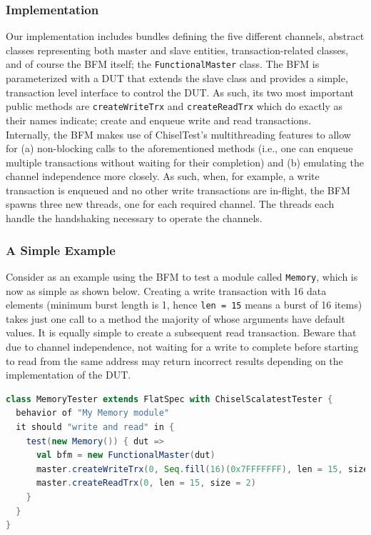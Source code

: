 \documentclass[conference]{IEEEtran}
\begin{document}
\subsubsection{Implementation}
Our implementation includes bundles defining the five different channels, abstract classes representing both master and slave entities, transaction-related classes, and of course the BFM itself; the \texttt{FunctionalMaster} class. The BFM is parameterized with a DUT that extends the slave class and provides a simple, transaction level interface to control the DUT. As such, its two most important public methods are \texttt{createWriteTrx} and \texttt{createReadTrx} which do exactly as their names indicate; create and enqueue write and read transactions. \\

Internally, the BFM makes use of ChiselTest's multithreading features to allow for (a) non-blocking calls to the aforementioned methods (i.e., one can enqueue multiple transactions without waiting for their completion) and (b) emulating the channel independence more closely. As such, when, for example, a write transaction is enqueued and no other write transactions are in-flight, the BFM spawns three new threads, one for each required channel. The threads each handle the handshaking necessary to operate the channels.

\subsubsection{A Simple Example}
Consider as an example using the BFM to test a module called \texttt{Memory}, which is now as simple as shown below. Creating a write transaction with 16 data elements (minimum burst length is 1, hence \texttt{len = 15} means a burst of 16 items) takes just one call to a method the majority of whose arguments have default values. It is equally simple to create a subsequent read transaction. Beware that due to channel independence, not waiting for a write to complete before starting to read from the same address may return incorrect results depending on the implementation of the DUT.
\begin{lstlisting}[language=scala, caption={Using the AXI4 BFM with ChiselTest}, label={lst:axitest}]
class MemoryTester extends FlatSpec with ChiselScalatestTester {
  behavior of "My Memory module"
  it should "write and read" in {
    test(new Memory()) { dut =>
      val bfm = new FunctionalMaster(dut)
      master.createWriteTrx(0, Seq.fill(16)(0x7FFFFFFF), len = 15, size = 2)
      master.createReadTrx(0, len = 15, size = 2)
    }
  }
}
\end{lstlisting}
\end{document}
